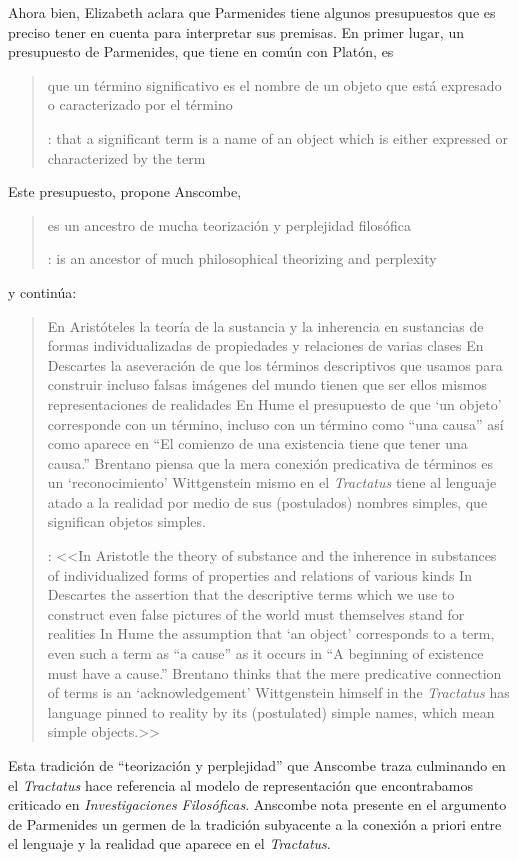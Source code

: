 Ahora bien, Elizabeth aclara que Parmenides tiene algunos presupuestos que es preciso tener en cuenta para interpretar sus premisas. En primer lugar, un presupuesto de Parmenides, que tiene en común con Platón, es \blockquote[{\cite[x]{anscombe1981parmenides}}: that a significant term is a name of an object which is either expressed or characterized by the term]{que un término significativo es el nombre de un objeto que está expresado o caracterizado por el término}. Este presupuesto, propone Anscombe, \blockquote[{\cite[xi]{anscombe1981parmenides}}: is an ancestor of much philosophical theorizing and perplexity]{es un ancestro de mucha teorización y perplejidad filosófica} y continúa: \blockquote[{\cite[xi]{anscombe1981parmenides}}: <<In Aristotle \textelp{} the theory of substance and the inherence in substances of individualized forms of properties and relations of various kinds \textelp{} In Descartes \textelp{} the assertion that the descriptive terms which we use to construct even false pictures of the world must themselves stand for realities \textelp{} In Hume \textelp{} the assumption that `an object' corresponds to a term, even such a term as ``a cause'' as it occurs in ``A beginning of existence must have a cause.'' \textelp{} Brentano thinks that the mere predicative connection of terms is an `acknowledgement' \textelp{} Wittgenstein himself in the \emph{Tractatus} has language pinned to reality by its (postulated) simple names, which mean simple objects.>>]{En Aristóteles \textelp{} la teoría de la sustancia y la inherencia en sustancias de formas individualizadas de propiedades y relaciones de varias clases \textelp{} En Descartes \textelp{} la aseveración de que los términos descriptivos que usamos para construir incluso falsas imágenes del mundo tienen que ser ellos mismos representaciones de realidades \textelp{} En Hume \textelp{} el presupuesto de que `un objeto' corresponde con un término, incluso con un término como ``una causa'' así como aparece en ``El comienzo de una existencia tiene que tener una causa.'' \textelp{} Brentano piensa que la mera conexión predicativa de términos es un `reconocimiento' \textelp{} Wittgenstein mismo en el \emph{Tractatus} tiene al lenguaje atado a la realidad por medio de sus (postulados) nombres simples, que significan objetos simples.} Esta tradición de \enquote{teorización y perplejidad} que Anscombe traza culminando en el \emph{Tractatus} hace referencia al modelo de representación que encontrabamos criticado en \emph{Investigaciones Filosóficas}. Anscombe nota presente en el argumento de Parmenides un germen de la tradición subyacente a la conexión a priori entre el lenguaje y la realidad que aparece en el \emph{Tractatus}.

